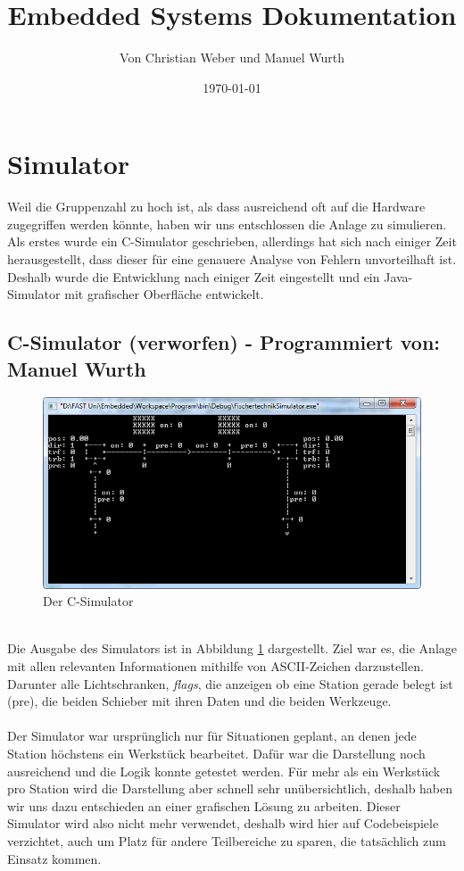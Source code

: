 \documentclass[fontsize=11pt,a4paper,final]{scrartcl}[2003/01/01]
\title{Embedded Systems Dokumentation}
\author{Von Christian Weber und Manuel Wurth}
\date{\today}
\makeatletter
\def\ScaleIfNeeded{%
	\ifdim\Gin@nat@width>\linewidth
		\linewidth
	\else
		\Gin@nat@width
	\fi
}
\newcommand*{\manu}{%
	Programmiert von: Manuel Wurth
}
\makeatother
\begin{document}
	
\maketitle
\newpage
\tableofcontents
\newpage

\section{Simulator}
Weil die Gruppenzahl zu hoch ist, als dass ausreichend oft auf die Hardware zugegriffen werden könnte, haben wir uns entschlossen die Anlage zu simulieren. Als erstes wurde ein C-Simulator geschrieben, allerdings hat sich nach einiger Zeit herausgestellt, dass dieser für eine genauere Analyse von Fehlern unvorteilhaft ist. 
Deshalb wurde die Entwicklung nach einiger Zeit eingestellt und ein Java-Simulator mit grafischer Oberfläche entwickelt.

\subsection{C-Simulator (verworfen) - \manu}

\begin{figure}[H]
	\centering
	\includegraphics[width=1\ScaleIfNeeded]{Bilder/C-Simulator.png}
	\caption{Der C-Simulator}
	\label{fig:C-Simulator}
\end{figure} \ \\
\noindent Die Ausgabe des Simulators ist in Abbildung \ref{fig:C-Simulator} dargestellt. Ziel war es, die Anlage mit allen relevanten Informationen mithilfe von ASCII-Zeichen darzustellen. Darunter alle Lichtschranken, \textit{flags}, die anzeigen ob eine Station gerade belegt ist (pre), die beiden Schieber mit ihren Daten und die beiden Werkzeuge. \\ \\
Der Simulator war ursprünglich nur für Situationen geplant, an denen jede Station höchstens ein Werkstück bearbeitet. Dafür war die Darstellung noch ausreichend und die Logik konnte getestet werden. Für mehr als ein Werkstück pro Station wird die Darstellung aber schnell sehr unübersichtlich, deshalb haben wir uns dazu entschieden an einer grafischen Lösung zu arbeiten. Dieser Simulator wird also nicht mehr verwendet, deshalb wird hier auf Codebeispiele verzichtet, auch um Platz für andere Teilbereiche zu sparen, die tatsächlich zum Einsatz kommen.
\end{document}

